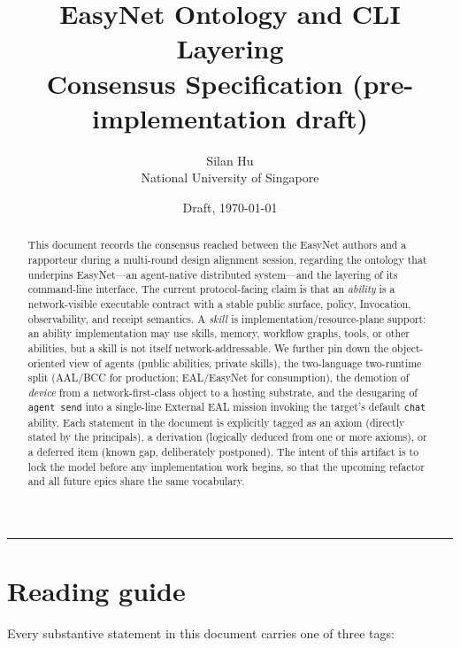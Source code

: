 \documentclass[11pt,a4paper]{article}
\title{
    \vspace{-2em}
    \textbf{\Large EasyNet Ontology and CLI Layering}\\[0.3em]
    \large Consensus Specification (pre-implementation draft)
}
\author{
    Silan Hu \\ \small National University of Singapore
}
\date{Draft, \today}
\begin{document}
\maketitle

\begin{abstract}
\noindent
This document records the consensus reached between the EasyNet authors and a
rapporteur during a multi-round design alignment session, regarding the
ontology that underpins EasyNet---an agent-native distributed system---and
the layering of its command-line interface. The current protocol-facing claim
is that an \emph{ability} is a network-visible executable contract with a
stable public surface, policy, Invocation, observability, and receipt
semantics. A \emph{skill} is implementation/resource-plane support: an
ability implementation may use skills, memory, workflow graphs, tools, or
other abilities, but a skill is not itself network-addressable. We further
pin down the object-oriented view of agents (public abilities, private
skills), the two-language two-runtime split (AAL/BCC for production;
EAL/EasyNet for consumption), the demotion of \emph{device} from a
network-first-class object to a hosting substrate, and the desugaring of
\texttt{agent send} into a single-line External EAL mission invoking the
target's default \texttt{chat} ability. Each statement in the document is
explicitly tagged as an axiom (directly stated by the principals), a
derivation (logically deduced from one or more axioms), or a deferred item
(known gap, deliberately postponed). The intent of this artifact is to lock
the model before any implementation work begins, so that the upcoming
refactor and all future epics share the same vocabulary.
\end{abstract}

\tableofcontents
\vspace{1em}
\hrule
\vspace{1em}

\section{Reading guide}
\label{sec:reading-guide}

Every substantive statement in this document carries one of three tags:
\end{document}
